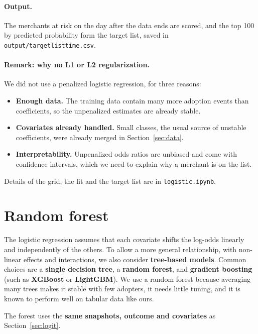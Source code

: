 \documentclass[11pt]{article}
\newcommand{\code}[1]{\begingroup\renewcommand{\_}{\textunderscore\allowbreak}\texttt{#1}\endgroup}  %
\begin{document}
\paragraph{Output.} The merchants at risk on the day after the data ends are scored, and the top 100 by predicted probability form the target list, saved in \code{output/target\_list\_time.csv}.

\paragraph{Remark: why no L1 or L2 regularization.} We did not use a penalized logistic regression, for three reasons:
\begin{itemize}
  \item \textbf{Enough data.} The training data contain many more adoption events than coefficients, so the unpenalized estimates are already stable.
  \item \textbf{Covariates already handled.} Small classes, the usual source of unstable coefficients, were already merged in Section~\ref{sec:data}.
  \item \textbf{Interpretability.} Unpenalized odds ratios are unbiased and come with confidence intervals, which we need to explain why a merchant is on the list.
\end{itemize}
Details of the grid, the fit and the target list are in \code{logistic.ipynb}.

\section{Random forest}\label{sec:rf}

The logistic regression assumes that each covariate shifts the log-odds linearly and independently of the others. To allow a more general relationship, with non-linear effects and interactions, we also consider \textbf{tree-based models}. Common choices are a \textbf{single decision tree}, a \textbf{random forest}, and \textbf{gradient boosting} (such as \textbf{XGBoost} or \textbf{LightGBM}). We use a random forest because averaging many trees makes it stable with few adopters, it needs little tuning, and it is known to perform well on tabular data like ours.

The forest uses the \textbf{same snapshots, outcome and covariates} as Section~\ref{sec:logit}.
\end{document}
